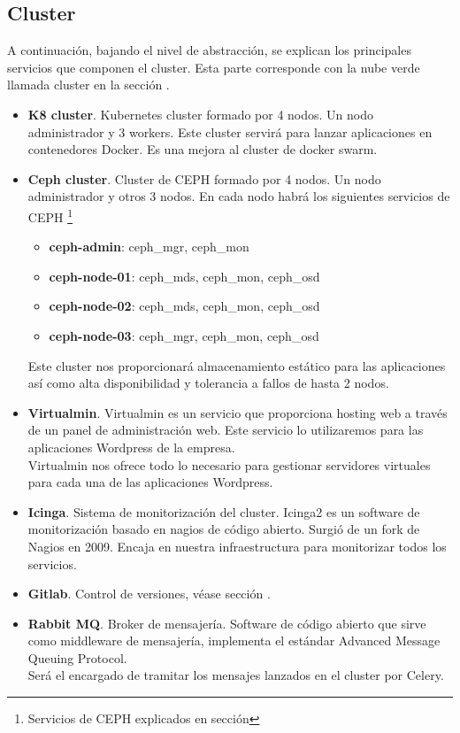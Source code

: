 	\subsection{Cluster}
		\begin{paragraph}
			A continuación, bajando el nivel de abstracción, se explican los principales servicios que componen el cluster. Esta parte corresponde con la nube verde llamada cluster en la sección .
			\begin{itemize}
				\item \textbf{K8 cluster}. Kubernetes cluster formado por 4 nodos. Un nodo administrador y 3 workers. Este cluster servirá para lanzar aplicaciones en contenedores Docker. Es una mejora al cluster de docker swarm.
				\item \textbf{Ceph cluster}. Cluster de CEPH formado por 4 nodos. Un nodo administrador y otros 3 nodos. En cada nodo habrá los siguientes servicios de CEPH \footnote{Servicios de CEPH explicados en sección }
				\begin{itemize}
					\item \textbf{ceph-admin}: ceph\_mgr, ceph\_mon
					\item \textbf{ceph-node-01}: ceph\_mds, ceph\_mon, ceph\_osd
					\item \textbf{ceph-node-02}: ceph\_mds, ceph\_mon, ceph\_osd
					\item \textbf{ceph-node-03}: ceph\_mgr, ceph\_mon, ceph\_osd
				\end{itemize}
				Este cluster nos proporcionará almacenamiento estático para las aplicaciones así como alta disponibilidad y tolerancia a fallos de hasta 2 nodos.
				
				\item \textbf{Virtualmin}. Virtualmin \cite{virtualmin:online} es un servicio que proporciona hosting web a través de un panel de administración web. Este servicio lo utilizaremos para las aplicaciones Wordpress de la empresa. \\
				Virtualmin nos ofrece todo lo necesario para gestionar servidores virtuales para cada una de las aplicaciones Wordpress. 
				\item \textbf{Icinga}. Sistema de monitorización del cluster. Icinga2 es un software de monitorización basado en nagios de código abierto. Surgió de un fork de Nagios en 2009. Encaja en nuestra infraestructura para monitorizar todos los servicios.
				\item \textbf{Gitlab}. Control de versiones, véase sección .
				\item \textbf{Rabbit MQ}. Broker de mensajería. Software de código abierto que sirve como middleware de mensajería, implementa el estándar Advanced Message Queuing Protocol. \\ 
				Será el encargado de tramitar los mensajes lanzados en el cluster por Celery. 
			\end{itemize}
		\clearpage

\end{paragraph}

